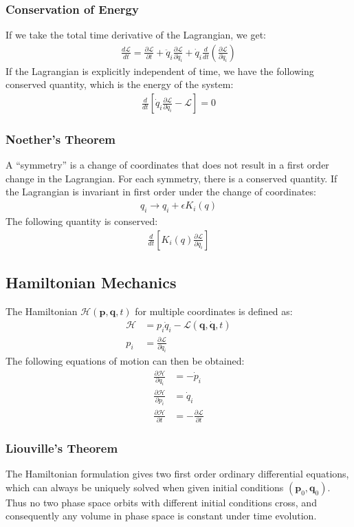 \documentclass[11pt, letterpaper]{article}
\newcommand{\Lagr}{\mathcal{L}}	       %
\newcommand{\Hami}{\mathcal{H}}	       %
\newcommand{\ve}[1]{
  \ensuremath{\bm{#1}}}	               %
\newcommand{\pd}[2]{
  \ensuremath{
    \frac{\partial #1}{\partial #2} }} %
\begin{document}
\begin{multicols*}{3}
\subsubsection{Conservation of Energy}
If we take the total time derivative of the Lagrangian, we get:
\begin{align*}
  \frac{d\Lagr}{dt} = \pd{\Lagr}{t} + \ddot{q}_i\pd{\Lagr}{\dot{q}_i} +
  \dot{q}_i \frac{d}{dt} \left( \pd{\Lagr}{\dot{q}_i} \right)
\end{align*}
If the Lagrangian is explicitly independent of time, we have the following conserved quantity, which is the energy of the system:
\begin{align*}
  \frac{d}{dt} \left[ \dot{q}_i \pd{\Lagr}{\dot{q}_i} - \Lagr \right] = 0
\end{align*}
\subsubsection{Noether's Theorem}
A ``symmetry'' is a change of coordinates that does not result in a first order
change in the Lagrangian. For each symmetry, there is a conserved quantity. If
the Lagrangian is invariant in first order under the change of coordinates:
\begin{align*}
  q_i \rightarrow q_i + \epsilon K_i (q)
\end{align*}
The following quantity is conserved:
\begin{align*}
  \frac{d}{dt} \left[ K_i(q) \pd{\Lagr}{\dot{q_i}} \right]
\end{align*}
\subsection{Hamiltonian Mechanics}
The Hamiltonian $\Hami(\ve{p},\ve{q},t)$ for multiple coordinates is defined as:
\begin{align*}
  \Hami &= p_i \dot{q}_i - \Lagr(\ve{q}, \dot{\ve{q}}, t) \\
  p_i &= \pd{\Lagr}{\dot{q}_i}
\end{align*}
The following equations of motion can then be obtained:
\begin{align*}
  \pd{\Hami}{q_i} &= -\dot{p}_i \\
  \pd{\Hami}{p_i} &= \dot{q}_i \\
  \pd{\Hami}{t} &= - \pd{\Lagr}{t}
\end{align*}
\subsubsection{Liouville's Theorem}
The Hamiltonian formulation gives two first order ordinary differential
equations, which can always be uniquely solved when given initial conditions
$(\ve{p}_0, \ve{q}_0)$. Thus no two phase space orbits with different initial
conditions cross, and consequently any volume in phase space is constant under
time evolution.

\end{multicols*}
\end{document}
